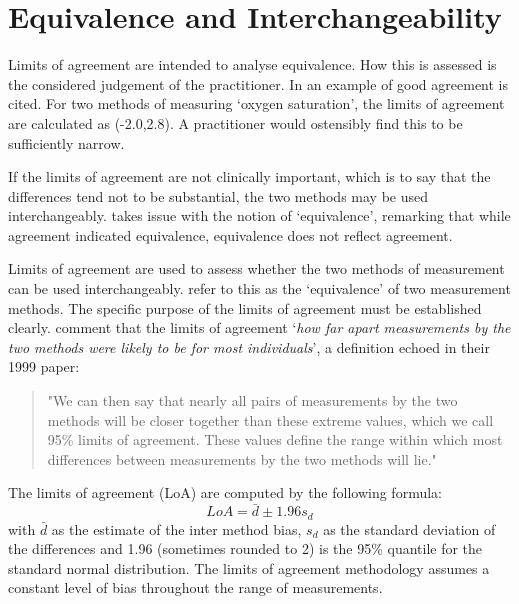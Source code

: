 \documentclass[12pt, a4paper]{report}
\theoremstyle{plain}
\theoremstyle{definition}
\theoremstyle{remark}
\begin{document}

\newpage





\section{Equivalence and Interchangeability}
Limits of agreement are intended to analyse equivalence. How this
is assessed is the considered judgement of the practitioner. In
\citet{BA86} an example of good agreement is cited. For two
methods of measuring `oxygen saturation', the limits of agreement
are calculated as (-2.0,2.8). A practitioner would ostensibly find
this to be sufficiently narrow.

If the limits of agreement are not clinically important, which is
to say that the differences tend not to be substantial, the two
methods may be used interchangeably. \citet{DunnSEME} takes issue
with the notion of `equivalence', remarking that while agreement
indicated equivalence, equivalence does not reflect agreement.


Limits of agreement are used to assess whether the two methods of measurement can be used interchangeably. \citet{BA86} refer to
this as the `equivalence' of two measurement methods. The specific purpose of the limits of
agreement must be
established clearly. \citet*{BA95} comment that the limits of agreement `\textit{how
	far apart measurements by the two methods were likely to be for
	most individuals}', a definition echoed in their 1999 paper:

\begin{quote}"We can then say that nearly all pairs
	of measurements by the two methods will be closer together than
	these extreme values, which we call 95\% limits of agreement.
	These values define the range within which most differences
	between measurements by the two methods will lie."
\end{quote}

	
	The limits of agreement (LoA) are computed by the following
	formula:
	\[
	LoA = \bar{d} \pm 1.96 s_{d}
	\]
	with $\bar{d}$ as the estimate of the inter method bias, $s_{d}$
	as the standard deviation of the differences and 1.96 (sometimes rounded to 2) is the 95\%
	quantile for the standard normal distribution. The limits of agreement methodology assumes a constant level of bias throughout the range of measurements.
\end{document}
